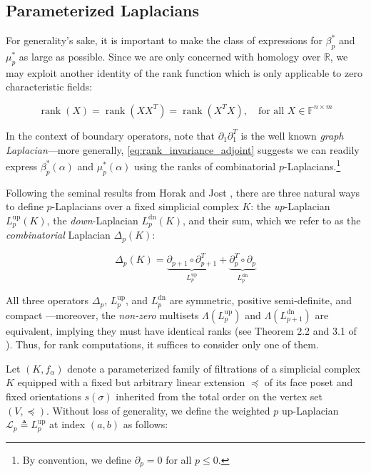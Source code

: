 \documentclass[pdflatex,sn-mathphys-num]{sn-jnl}
\begin{document}
\subsection{Parameterized Laplacians}\label{sec:laplacian_theory2}

For generality's sake, it is important to make the class of expressions for \(\beta_{p}^{\ast}\) and \(\mu_{p}^{\ast}\) as large as possible. Since we are only concerned with homology over \(\mathbb{R}\), we may exploit another identity of the rank function which is only applicable to zero characteristic fields:

\[\operatorname{rank}(X) = \operatorname{rank} \left( XX^{T} \right)  = \operatorname{rank} \left( X^{T}X \right) ,\quad\text{for all }X \in \mathbb{F}^{n \times m}\] \protect{}\label{eq:rank_invariance_adjoint}{}

In the context of boundary operators, note that \(\partial_{1}\partial_{1}^{T}\) is the well known \emph{graph Laplacian}---more generally, \ref{eq:rank_invariance_adjoint} suggests we can readily express \(\beta_{p}^{\ast}(\alpha)\) and \(\mu_{p}^{\ast}(\alpha)\) using the ranks of combinatorial \(p\)-Laplacians.\footnote{By convention, we define \(\partial_{p} = 0\) for all \(p \leq 0\).}

Following the seminal results from Horak and Jost \cite{horak2013spectra}, there are three natural ways to define \(p\)-Laplacians over a fixed simplicial complex \(K\): the \emph{up}-Laplacian \(L_{p}^{\operatorname{up}}(K)\), the \emph{down}-Laplacian \(L_{p}^{\operatorname{dn}}(K)\), and their sum, which we refer to as the \emph{combinatorial} Laplacian \(\Delta_{p}(K)\):

\[\Delta_{p}(K) = \underset{L_{p}^{\operatorname{up}}}{\underbrace{\partial_{p + 1} \circ \partial_{p + 1}^{T}}} + \underset{L_{p}^{\operatorname{dn}}}{\underbrace{\partial_{p}^{T} \circ \partial_{p}}}\] \protect{}\label{eq:comb_lap}{}

All three operators \(\Delta_{p}\), \(L_{p}^{\operatorname{up}}\), and \(L_{p}^{\operatorname{dn}}\) are symmetric, positive semi-definite, and compact \cite{memoli2022persistent}---moreover, the \emph{non-zero} multisets \(\Lambda \left( L_{p}^{\operatorname{up}} \right) \) and \(\Lambda \left( L_{p + 1}^{\operatorname{dn}} \right) \) are equivalent, implying they must have identical ranks (see Theorem 2.2 and 3.1 of \cite{horak2013spectra}). Thus, for rank computations, it suffices to consider only one of them.

Let \(\left( K,f_{\alpha} \right)\) denote a parameterized family of filtrations of a simplicial complex \(K\) equipped with a fixed but arbitrary linear extension \(\preceq\) of its face poset and fixed orientations \(s(\sigma)\) inherited from the total order on the vertex set \( (V, \preceq ) \). Without loss of generality, we define the weighted \(p\) up-Laplacian \(\mathcal{L}_{p} \triangleq L_{p}^{\operatorname{up}}\) at index \((a,b)\) as follows:
\end{document}
